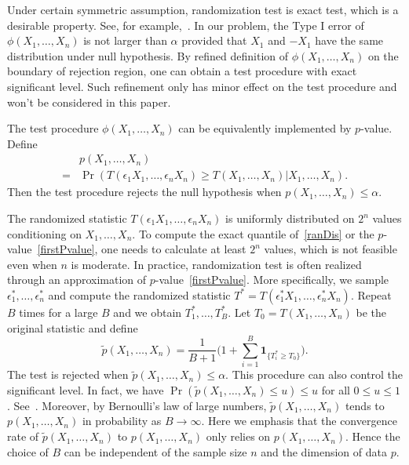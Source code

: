 \documentclass[smallcondensed,final,natbib]{svjour3}          %
\begin{document}
Under certain symmetric assumption, randomization test is exact test, which is a desirable property.
 See, for example,~\citet[Chapter 15]{Lehmann}.
In our problem, the Type I error of $\phi(X_1,\ldots,X_n)$ is not larger than $\alpha$ provided that $X_1$ and $-X_1$ have the same distribution under null hypothesis.
 By refined definition of $\phi(X_1,\ldots,X_n)$ on the boundary of rejection region, one can obtain a test procedure with exact significant  level. 
Such refinement only has minor effect on the test procedure and won't be considered in this paper.

The test procedure $\phi(X_1,\ldots, X_n)$ can be equivalently implemented by $p$-value. Define 
\begin{equation}\label{firstPvalue}
    \begin{aligned}
        &p(X_1,\ldots, X_n)\\
        =&\Pr(T(\epsilon_1 X_1,\ldots,\epsilon_n X_n)\geq T( X_1,\ldots,X_n)|X_1,\ldots,X_n).
    \end{aligned}
\end{equation}
Then the test procedure rejects the null hypothesis when $p(X_1,\ldots, X_n)\leq \alpha$. 

 The randomized statistic $T(\epsilon_1 X_1,\ldots,\epsilon_n X_n)$ is uniformly distributed on $2^n$ values conditioning on $X_1,\ldots, X_n$.
To compute the exact quantile of~\eqref{ranDis} or the $p$-value~\eqref{firstPvalue}, one needs to calculate at least $2^n$ values, which is not feasible even when $n$ is moderate.
In practice, randomization test is often realized through an approximation of $p$-value~\eqref{firstPvalue}.
More specifically, we sample  $\epsilon_1^*,\ldots,\epsilon_n^*$ and compute the randomized statistic $T^*=T(\epsilon_1^* X_1,\ldots,\epsilon_n^* X_n)$.
Repeat $B$ times for a large $B$ and we obtain $T_1^*,\ldots,T_B^*$.
Let $T_0=T(X_1,\ldots,X_n)$ be the original statistic and define
\begin{equation*}
\tilde{p}(X_1,\ldots,X_n)=\frac{1}{B+1}\big(1+\sum_{i=1}^B \mathbf{1}_{\{T_i^*\geq T_0\}}\big).
\end{equation*}
The test is rejected when $\tilde{p}(X_1,\ldots,X_n)\leq \alpha$. This procedure can also control the significant level.
In fact, we have
$\Pr(\tilde{p}(X_1,\ldots,X_n)\leq u)\leq u$ for all $0\leq u\leq 1$.
See~\citet[Page $636$]{Lehmann}.
Moreover, by Bernoulli's law of large numbers, $\tilde{p}(X_1,\ldots,X_n)$ tends to $p(X_1,\ldots,X_n)$ in probability  as $B\to \infty$.
{Here we emphasis that the convergence rate of $\tilde{p}(X_1,\ldots,X_n)$ to $p(X_1,\ldots,X_n)$ only relies on $p(X_1,\ldots,X_n)$.
Hence the choice of $B$ can be independent of the sample size $n$ and the dimension of data $p$.}
\end{document}
